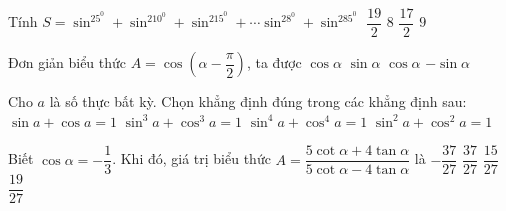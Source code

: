 \begin{ex}%
	Tính $S=\sin^25^0+\sin^210^0+\sin^215^0+ \cdots \sin^28^0+\sin^285^0$ 
	 \choice
		{$\dfrac{19}{2}$} 
		{$  8$}
		{\True  $\dfrac{17}{2}$}
		{$ 9$} 
\end{ex}

\begin{ex}%
	 Đơn giản biểu thức $ A=\cos\left(\alpha-\dfrac{\pi}{2}\right)$, ta được
	\choice 
		 {$\cos\alpha $}
		{\True $\sin\alpha  $}
		{$\cos\alpha $} 
		{$-\sin\alpha  $}
\end{ex}

\begin{ex}%
	Cho $ a$ là số  thực bất kỳ. Chọn khẳng định đúng trong các khẳng định sau:
	 \choice
		 {$\sin a+\cos a=1$}
		 {$\sin^3a+\cos^3a=1$}
		{$\sin^4a+\cos^4a=1$} 
		{\True  $\sin^2a+\cos^2a=1$}
\end{ex}

\begin{ex}%
	Biết $\cos\alpha=-\dfrac{1}{3}$. Khi  đó, giá trị biểu thức $ A=\dfrac{5\cot\alpha+4\tan\alpha}{5\cot\alpha-4\tan\alpha}$ là
	\choice 
		{\True  $-\dfrac{37}{27}$}
		{$\dfrac{37}{27}$} 
		 {$\dfrac{15}{27}$}
		 {$\dfrac{19}{27}$}
\end{ex}

